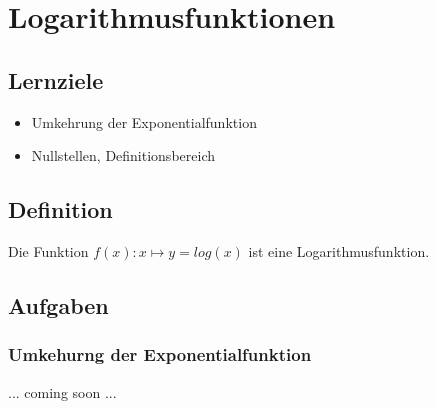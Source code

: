 
\section{Logarithmusfunktionen}
\subsection*{Lernziele}

\begin{itemize}
\item Umkehrung der Exponentialfunktion
\item Nullstellen, Definitionsbereich
\end{itemize}



\subsection{Definition}
Die Funktion $f(x): x \mapsto y = log(x)$ ist eine
Logarithmusfunktion.

\subsection*{Aufgaben}

\subsubsection{Umkehurng der
  Exponentialfunktion}
... coming soon ...
